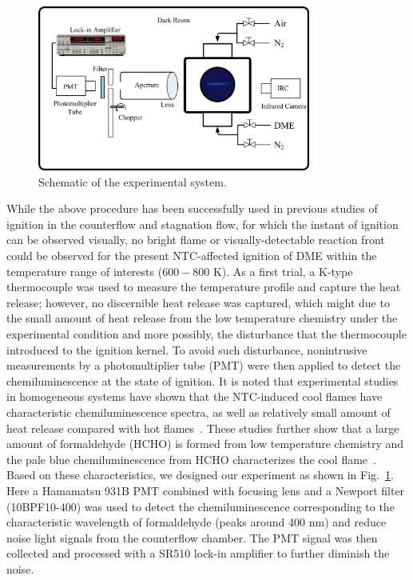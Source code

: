 \documentclass[review,3p,times]{elsarticleUS}
\begin{document}
\begin{figure}[ht]
  \centering
  \scriptsize
  \vspace{-0.1in}
  \includegraphics[width=0.8\textwidth]{Experimental_Setup.png}
  \normalsize
  \vspace{-0.1in}
  \caption{Schematic of the experimental system.}
  \label{fig:setup}
\end{figure}

While the above procedure has been successfully used in previous studies of ignition in the counterflow and stagnation flow, for which the instant of ignition can be observed visually, no bright flame or visually-detectable reaction front could be observed for the present NTC-affected ignition of DME within the temperature range of interests ($600-800$ K). 
As a first trial, a K-type thermocouple was used to measure the temperature profile and capture the heat release; however, no discernible heat release was captured, which might due to the small amount of heat release from the low temperature chemistry under the experimental condition and more possibly, the disturbance that the thermocouple introduced to the ignition kernel.  To avoid such disturbance, nonintrusive measurements by a photomultiplier tube (PMT)  were  then applied to detect the chemiluminescence at the state of ignition.  It is noted that experimental studies in homogeneous systems have shown that the NTC-induced cool flames have characteristic chemiluminescence spectra, as well as relatively small amount of heat release compared with hot flames~\cite{sheinson73,ohta91}.  These studies further show that a large amount of formaldehyde (HCHO) is formed from low temperature chemistry and the pale blue chemiluminescence from HCHO characterizes the cool flame~\cite{gaydonbook}.  Based on these characteristics, we designed our experiment as shown in Fig.~\ref{fig:setup}. Here a Hamamatsu 931B PMT combined with focusing lens and a Newport filter (10BPF10-400) was used to detect the chemiluminescence corresponding to the characteristic wavelength of formaldehyde (peaks around 400 nm) and reduce noise light signals from the counterflow chamber. The PMT signal was then collected and processed with a SR510 lock-in amplifier to further diminish the noise. 
\end{document}
